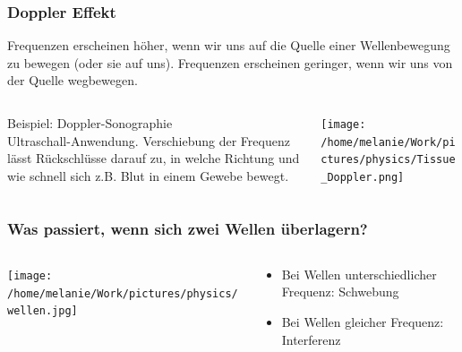 \documentclass{beamer}
\begin{document}
\begin{frame}
\frametitle{Doppler Effekt}

Frequenzen erscheinen höher, wenn wir uns auf die Quelle einer Wellenbewegung zu bewegen (oder sie auf uns). Frequenzen erscheinen geringer, wenn wir uns von der Quelle wegbewegen. 


\begin{columns}[c]

\pause

\begin{column}{5cm}

Beispiel: Doppler-Sonographie \\

Ultraschall-Anwendung. Verschiebung der Frequenz lässt Rückschlüsse darauf zu, in welche Richtung und wie schnell sich z.B. Blut in einem Gewebe bewegt.


\end{column}

\begin{column}{5cm}
\begin{center}
\texttt{[image: /home/melanie/Work/pictures/physics/Tissue\_Doppler.png]}
\end{center}
\end{column}

\end{columns}

\end{frame}




\begin{frame}
\frametitle{Was passiert, wenn sich zwei Wellen überlagern?}

\begin{columns}[c]

\begin{column}{5cm}

\begin{center}
\texttt{[image: /home/melanie/Work/pictures/physics/wellen.jpg]}
\end{center}


\end{column}

\pause

\begin{column}{5cm}

\begin{itemize}
\item
Bei Wellen unterschiedlicher Frequenz:  Schwebung
\item
Bei Wellen gleicher Frequenz: Interferenz 

\end{itemize}


\end{column}

\end{columns}


\end{frame}
\end{document}
